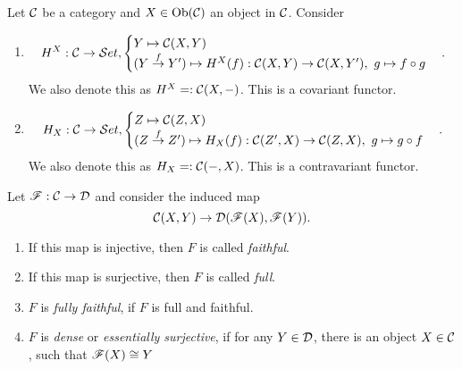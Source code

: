\begin{bsp}
  Let $\mathcal{C}$ be a category and $X\in \text{Ob}(\mathcal{C})$ an object in $\mathcal{C}$. Consider
  \begin{enumerate}
    \item
    \[
    H^{X}:\mathcal{C}\to \mathcal{S}et,\begin{cases}Y\mapsto \mathcal{C}(X,Y)\\ (Y\overset{f}{\to}Y')\mapsto H^X(f): \mathcal{C}(X,Y)\to \mathcal{C}(X,Y'),~g\mapsto f\circ g\end{cases}.
    \] We also denote this as $H^X=:\mathcal{C}(X,\mathrm{-})$. \coms This is a covariant functor.\come
    \item
    \[H_X:\mathcal{C}\to \mathcal{S}et,\begin{cases}Z\mapsto \mathcal{C}(Z,X)\\ (Z\overset{f}{\to}Z')\mapsto H_X(f): \mathcal{C}(Z',X)\to \mathcal{C}(Z,X),~g\mapsto g\circ f\end{cases}.
    \]
    We also denote this as $H_X=:\mathcal{C}(\mathrm{-},X)$. \coms This is a contravariant functor.\come
  \end{enumerate}
\end{bsp}
\begin{defn}
  Let $\mathscr{F}:\mathcal{C}\to \mathcal{D}$ and consider the induced map
  \[
  \mathcal{C}(X,Y)\to \mathcal{D}(\mathscr{F}(X),\mathscr{F}(Y)).
  \]
  \begin{enumerate}
    \item If this map is injective, then $F$ is called \emph{faithful}.
    \item If this map is surjective, then $F$ is called \emph{full}.
    \item $F$ is \emph{fully faithful}, if $F$ is full and faithful.
    \item $F$ is \emph{dense}  or \emph{essentially surjective}, if for any $Y\in \mathcal{D}$, there is an object $X\in \mathcal{C}$, such that $\mathscr{F}(X)\cong Y$
  \end{enumerate}
\end{defn}

